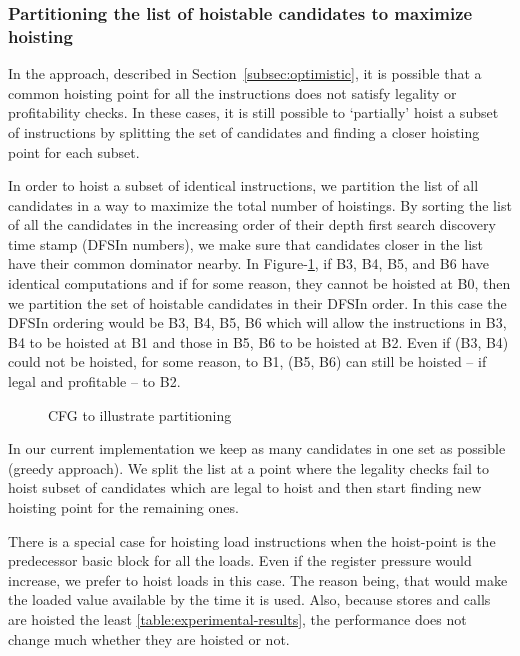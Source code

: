\documentclass[acmlarge,review]{acmart}\settopmatter{printfolios=true}
\begin{document}
\subsubsection{Partitioning the list of hoistable candidates to maximize hoisting}
\label{subsec:partition}
In the approach, described in Section~\ref{subsec:optimistic}, it is possible
that a common hoisting point for all the instructions does not satisfy legality
or profitability checks. In these cases, it is still possible to `partially'
hoist a subset of instructions by splitting the set of candidates and finding a
closer hoisting point for each subset.

In order to hoist a subset of identical instructions, we partition the list of
all candidates in a way to maximize the total number of hoistings.  By sorting
the list of all the candidates in the increasing order of their depth first
search discovery time stamp \cite{clrs} (DFSIn numbers), we make sure that
candidates closer in the list have their common dominator nearby. In
Figure-\ref{fig:dfsin}, if B3, B4, B5, and B6 have identical computations and if
for some reason, they cannot be hoisted at B0, then we partition the set of
hoistable candidates in their DFSIn order. In this case the DFSIn ordering would
be B3, B4, B5, B6 which will allow the instructions in B3, B4 to be hoisted at
B1 and those in B5, B6 to be hoisted at B2. Even if (B3, B4) could not be
hoisted, for some reason, to B1, (B5, B6) can still be hoisted -- if legal and
profitable -- to B2.

\begin{figure}
\centering
\caption{CFG to illustrate partitioning}
\label{fig:dfsin}
\end{figure}

In our current implementation we keep as many candidates in one set as possible
(greedy approach). We split the list at a point where the legality checks fail
to hoist subset of candidates which are legal to hoist and then start finding
new hoisting point for the remaining ones.


There is a special case for hoisting load instructions when the hoist-point is
the predecessor basic block for all the loads. Even if the register pressure
would increase, we prefer to hoist loads in this case. The reason being, that
would make the loaded value available by the time it is used. Also, because
stores and calls are hoisted the least \ref{table:experimental-results}, the
performance does not change much whether they are hoisted or not.
\end{document}

